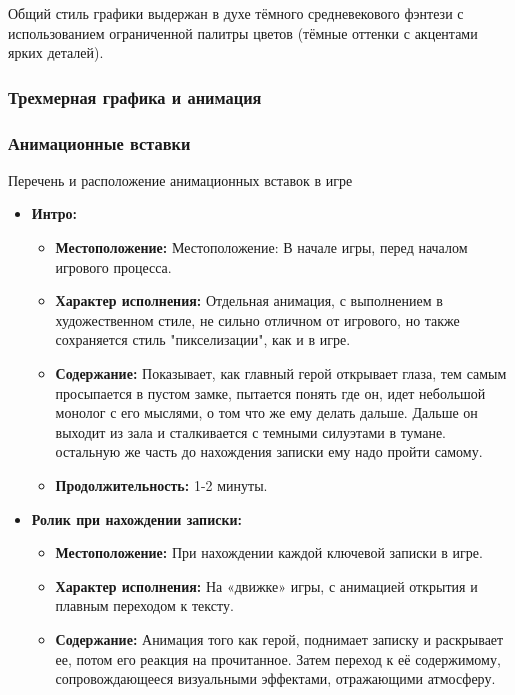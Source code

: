 \documentclass{article}
\begin{document}
Общий стиль графики выдержан в духе тёмного средневекового фэнтези с использованием ограниченной палитры цветов (тёмные оттенки с акцентами ярких деталей).
 

\subsubsection{Трехмерная графика и анимация}

\subsubsection{Анимационные вставки}
Перечень и расположение анимационных вставок в игре\par
\begin{itemize}
    \item \textbf{Интро:}  
    \begin{itemize}
        \item \textbf{Местоположение:}  Местоположение: В начале игры, перед началом игрового процесса.\par
        \item \textbf{Характер исполнения:} Отдельная анимация, с выполнением в художественном стиле, не сильно отличном от игрового, но также сохраняется стиль "пикселизации", как и в игре.\par
        \item \textbf{Содержание:} Показывает, как главный герой открывает глаза, тем самым просыпается в пустом замке, пытается понять где он, идет небольшой монолог с его мыслями, о том что же ему делать дальше. Дальше он выходит из зала и сталкивается с темными силуэтами в тумане.  остальную же часть до нахождения записки ему надо пройти самому.\par
        \item \textbf{Продолжительность:} 1-2 минуты.\par
  \end{itemize}
    \item \textbf{Ролик при нахождении записки:} 
     \begin{itemize}
        \item \textbf{Местоположение:}  При нахождении каждой ключевой записки в игре. \par
        \item \textbf{Характер исполнения:} На «движке» игры, с анимацией открытия и плавным переходом к тексту.\par
        \item \textbf{Содержание:} Анимация того как герой, поднимает записку и раскрывает ее, потом его реакция на прочитанное. Затем переход к её содержимому, сопровождающееся визуальными эффектами, отражающими атмосферу.\par

\end{itemize}
\end{itemize}
\end{document}
